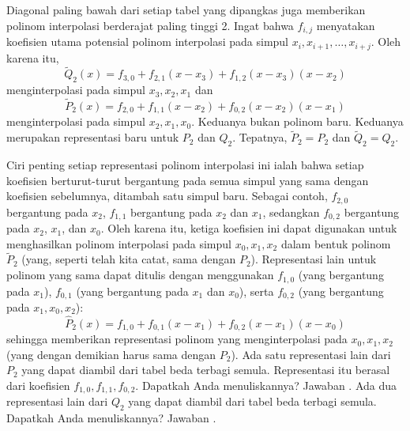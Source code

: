 Diagonal paling bawah dari setiap tabel yang dipangkas juga memberikan
polinom interpolasi berderajat paling tinggi 2. Ingat bahwa $f_{i,j}$
menyatakan koefisien utama potensial polinom interpolasi pada simpul
$x_{i},x_{i+1},\ldots,x_{i+j}$. Oleh karena itu, 
\[
\tilde{Q}_{2}(x)=f_{3,0}+f_{2,1}(x-x_{3})+f_{1,2}(x-x_{3})(x-x_{2})
\]
menginterpolasi pada simpul $x_{3},x_{2},x_{1}$ dan
\[
\tilde{P}_{2}(x)=f_{2,0}+f_{1,1}(x-x_{2})+f_{0,2}(x-x_{2})(x-x_{1})
\]
menginterpolasi pada simpul $x_{2},x_{1},x_{0}$. Keduanya bukan polinom
baru. Keduanya merupakan representasi baru untuk $P_{2}$ dan $Q_{2}$.
Tepatnya, $\tilde{P}_{2}=P_{2}$ dan $\tilde{Q}_{2}=Q_{2}$. 

Ciri penting setiap representasi polinom interpolasi ini ialah bahwa
setiap koefisien berturut-turut bergantung pada semua simpul yang
sama dengan koefisien sebelumnya, ditambah satu simpul baru. Sebagai
contoh, $f_{2,0}$ bergantung pada $x_{2}$, $f_{1,1}$ bergantung
pada $x_{2}$ dan $x_{1}$, sedangkan $f_{0,2}$ bergantung pada $x_{2}$,
$x_{1}$, dan $x_{0}$. Oleh karena itu, ketiga koefisien ini dapat
digunakan untuk menghasilkan polinom interpolasi pada simpul $x_{0},x_{1},x_{2}$
dalam bentuk polinom $\tilde{P}_{2}$ (yang, seperti telah kita catat,
sama dengan $P_{2}$). Representasi lain untuk polinom yang sama dapat
ditulis dengan menggunakan $f_{1,0}$ (yang bergantung pada $x_{1}$),
$f_{0,1}$ (yang bergantung pada $x_{1}$ dan $x_{0}$), serta $f_{0,2}$
(yang bergantung pada $x_{1},x_{0},x_{2}$):
\[
\hat{P}_{2}(x)=f_{1,0}+f_{0,1}(x-x_{1})+f_{0,2}(x-x_{1})(x-x_{0})
\]
sehingga memberikan representasi polinom yang menginterpolasi pada
$x_{0},x_{1},x_{2}$ (yang dengan demikian harus sama dengan $P_{2}$).
Ada satu representasi lain dari $P_{2}$ yang dapat diambil dari tabel
beda terbagi semula. Representasi itu berasal dari koefisien $f_{1,0},f_{1,1},f_{0,2}$.
Dapatkah Anda menuliskannya? Jawaban . Ada dua representasi
lain dari $Q_{2}$ yang dapat diambil dari tabel beda terbagi semula.
Dapatkah Anda menuliskannya? Jawaban .

